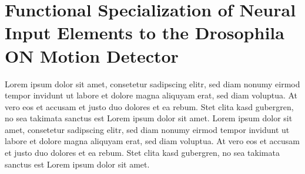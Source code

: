 \section{Functional Specialization of Neural Input Elements to the Drosophila ON Motion Detector}
\label{sct:manuscript_ammer}

Lorem ipsum dolor sit amet, consetetur sadipscing elitr, sed diam nonumy eirmod tempor invidunt ut labore et dolore magna aliquyam erat, sed diam voluptua. At vero eos et accusam et justo duo dolores et ea rebum. Stet clita kasd gubergren, no sea takimata sanctus est Lorem ipsum dolor sit amet. Lorem ipsum dolor sit amet, consetetur sadipscing elitr, sed diam nonumy eirmod tempor invidunt ut labore et dolore magna aliquyam erat, sed diam voluptua. At vero eos et accusam et justo duo dolores et ea rebum. Stet clita kasd gubergren, no sea takimata sanctus est Lorem ipsum dolor sit amet.

\cleardoublepage

